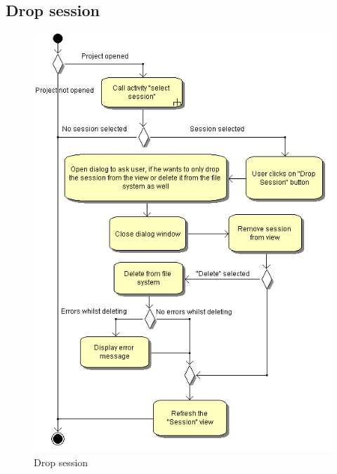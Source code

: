 \subsection{Drop session}
\begin{figure}[htb]
 \centering
 \includegraphics[height=0.7\textheight]{images/Activities/drop_session.png}
 \caption{Drop session}
 \label{ac_fg:drop_session}
\end{figure}

\clearpage
